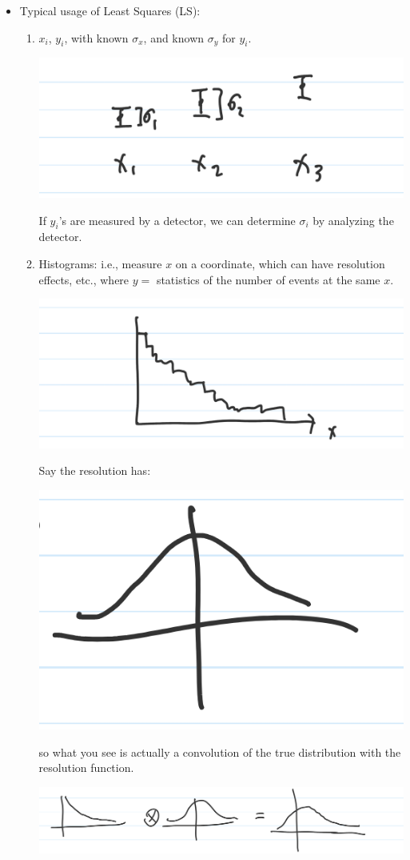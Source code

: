 \begin{itemize}
      \item Typical usage of Least Squares (LS):
            \begin{enumerate}
                  \item $x_i$, $y_i$, with known $\sigma_x$, and known $\sigma_y$ for $y_i$.

                        \includegraphics[width=0.4\linewidth]{Images/lec11-points.png}

                        If $y_i$'s are measured by a detector, we can determine $\sigma_i$ by analyzing the detector.
                  \item Histograms: i.e., measure $x$ on a coordinate, which can have resolution effects, etc., where $y =$ statistics of the number of events at the same $x$.

                        \includegraphics[width=0.4\linewidth]{Images/lec11-histogram.png}

                        Say the resolution has:

                        \includegraphics[width=0.4\linewidth]{Images/lec11-resolution.png}

                        so what you see is actually a convolution of the true distribution with the resolution function.

                        \includegraphics[width=0.4\linewidth]{Images/lec11-convolution.png}


\end{enumerate}
\end{itemize}
